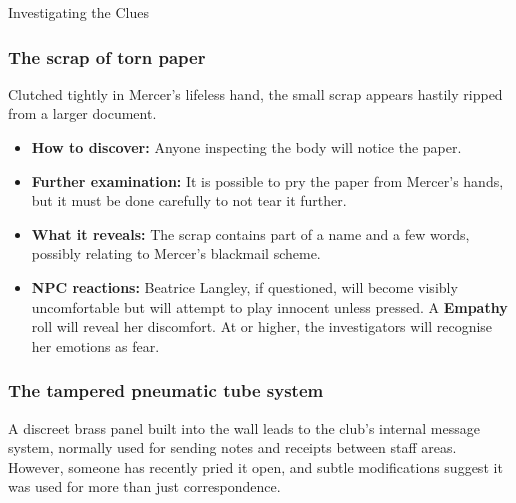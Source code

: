 \begin{CommentBox}{Investigating the Clues}
	\subsubsection*{The scrap of torn paper}
	Clutched tightly in Mercer’s lifeless hand, the small scrap appears hastily ripped from a larger document.
	\begin{itemize}
		\item \textbf{How to discover:} Anyone inspecting the body will notice the paper.
		\item \textbf{Further examination:} It is possible to pry the paper from Mercer's hands, but it must be done carefully to not tear it further.
		\item \textbf{What it reveals:} The scrap contains part of a name and a few words, possibly relating to Mercer's blackmail scheme.
		\item \textbf{NPC reactions:} Beatrice Langley, if questioned, will become visibly uncomfortable but will attempt to play innocent unless pressed. A \Basic \textbf{Empathy} roll will reveal her discomfort. At \Formidable or higher, the investigators will recognise her emotions as fear.
	\end{itemize}
	
	\subsubsection*{The tampered pneumatic tube system}
	A discreet brass panel built into the wall leads to the club’s internal message system, normally used for sending notes and receipts between staff areas. However, someone has recently pried it open, and subtle modifications suggest it was used for more than just correspondence.


\end{CommentBox}

